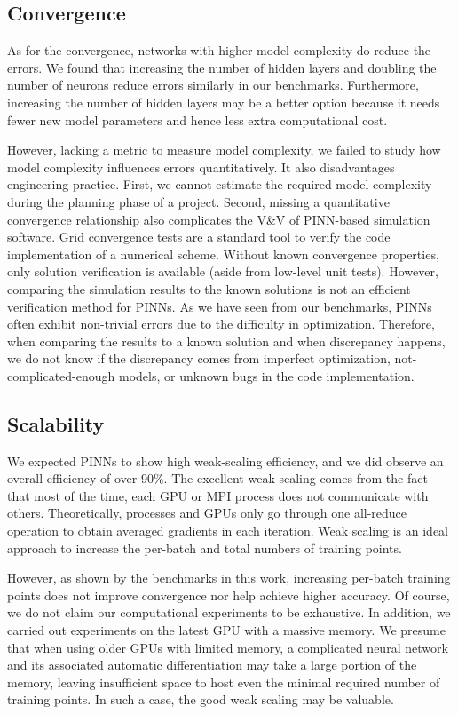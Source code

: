 \subsection*{Convergence}

As for the convergence, networks with higher model complexity do reduce the errors.
We found that increasing the number of hidden layers and doubling the number of neurons reduce errors similarly in our benchmarks.
Furthermore, increasing the number of hidden layers may be a better option because it needs fewer new model parameters and hence less extra computational cost.

However, lacking a metric to measure model complexity, we failed to study how model complexity influences errors quantitatively.
It also disadvantages engineering practice. 
First, we cannot estimate the required model complexity during the planning phase of a project.
Second, missing a quantitative convergence relationship also complicates the V\&V of PINN-based simulation software.
Grid convergence tests are a standard tool to verify the code implementation of a numerical scheme.
Without known convergence properties, only solution verification is available (aside from low-level unit tests).
However, comparing the simulation results to the known solutions is not an efficient verification method for PINNs.
As we have seen from our benchmarks, PINNs often exhibit non-trivial errors due to the difficulty in optimization.
Therefore, when comparing the results to a known solution and when discrepancy happens, we do not know if the discrepancy comes from imperfect optimization, not-complicated-enough models, or unknown bugs in the code implementation.

\subsection*{Scalability}

We expected PINNs to show high weak-scaling efficiency, and we did observe an overall efficiency of over 90\%.
The excellent weak scaling comes from the fact that most of the time, each GPU or MPI process does not communicate with others.
Theoretically, processes and GPUs only go through one all-reduce operation to obtain averaged gradients in each iteration.
Weak scaling is an ideal approach to increase the per-batch and total numbers of training points.

However, as shown by the benchmarks in this work, increasing per-batch training points does not improve convergence nor help achieve higher accuracy.
Of course, we do not claim our computational experiments to be exhaustive.
In addition, we carried out experiments on the latest GPU with a massive memory.
We presume that when using older GPUs with limited memory, a complicated neural network and its associated automatic differentiation may take a large portion of the memory, leaving insufficient space to host even the minimal required number of training points.
In such a case, the good weak scaling may be valuable.


